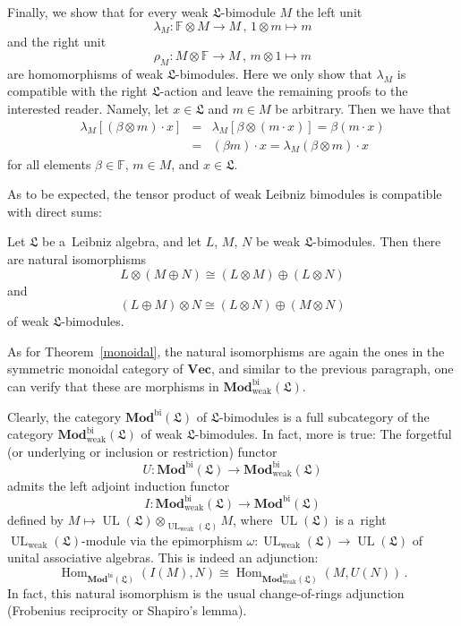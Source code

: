 \documentclass{jonasart}
\DeclareMathOperator{\bi}{bi}
\DeclareMathOperator{\Hom}{Hom}
\DeclareMathOperator{\UL}{UL}
\DeclareMathOperator{\weak}{weak}
\newcommand{\fbb}{\mathbb{F}}
\newcommand{\lf}{\mathfrak{L}}
\newcommand{\Mod}{\mathbf{Mod}}
\newcommand{\vect}{\mathbf{Vec}}
\begin{document}
	Finally, we show that for every weak $\lf$-bimodule $M$
	the left unit
	\[
		\lambda_M:\fbb\otimes M\to M\,,\,1\otimes m\mapsto m
	\]
	and the right unit
	\[
		\rho_M:M\otimes\fbb\to M\,,\,m\otimes 1\mapsto m
	\]
	are homomorphisms of weak $\lf$-bimodules. Here we only show that $\lambda_M$ is compatible with the right $\lf$-action and leave the remaining proofs to the interested reader. Namely, let $x\in\lf$ and $m\in M$ be arbitrary. Then we have that
	\begin{eqnarray*}
		\lambda_M [(\beta\otimes m)\cdot x] & = & \lambda_M [\beta\otimes
		(m\cdot x)]=\beta(m\cdot x)\\
		& = & (\beta m)\cdot x=\lambda_M (\beta\otimes m)\cdot x
	\end{eqnarray*}
	for all elements $\beta\in\fbb$, $m\in M$, and $x\in\lf$.

	As to be expected, the tensor product of weak Leibniz bimodules is compatible with direct sums:
	\begin{proposition}\label{distrib}
		Let $\lf$ be a~Leibniz algebra, and let $L$, $M$, $N$ be weak
		$\lf$-bimodules. Then there are natural isomorphisms
		\[
			L\otimes(M\oplus N)\cong(L\otimes M)\oplus(L\otimes N)
		\]
		and
		\[
			(L\oplus M)\otimes N\cong(L\otimes N)\oplus(M\otimes N)
		\]
		of weak $\lf$-bimodules.
	\end{proposition}
	As for Theorem~\ref{monoidal}, the natural isomorphisms are again the ones in the symmetric monoidal category of $\vect$, and similar to the previous paragraph, one can verify that these are morphisms in $\Mod_{\weak}^{\bi}(\lf)$.

	Clearly, the category $\Mod^{\bi}(\lf)$ of $\lf$-bimodules is a full subcategory of the category $\Mod_{\weak}^{\bi}(\lf)$ of weak
	$\lf$-bimodules. In fact, more is true: The forgetful (or underlying or inclusion or restriction) functor
	\[
		U:\Mod^{\bi}(\lf)\to\Mod_{\weak}^{\bi}(\lf)
	\]
	admits the left adjoint induction functor
	\[
		I:\Mod_{\weak}^{\bi}(\lf)\to\Mod^{\bi}(\lf)
	\]
	defined by $M\mapsto \UL(\lf)\otimes_{\UL_{\weak}(\lf)}M$, where
	$\UL(\lf)$ is a~right $\UL_{\weak}(\lf)$-module via the epimorphism
	$\omega:\UL_{\weak}(\lf)\to\UL(\lf)$ of unital associative algebras. This is indeed an adjunction:
	\[
		\Hom_{\Mod^{\bi}(\lf)}(I(M), N)\cong\Hom_{\Mod_{\weak}^{\bi}(\lf)}
		(M,U(N))\,.
	\]
	In fact, this natural isomorphism is the usual change-of-rings adjunction
	(Frobenius reciprocity or Shapiro's lemma).
\end{document}
